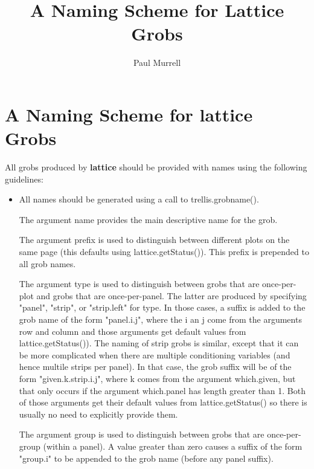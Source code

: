 \documentclass[10pt]{article}
\title{A Naming Scheme for Lattice Grobs}
\author{Paul Murrell}
\date{}
\newcommand{\pkg}[1]{{\bfseries #1}}
\newcommand{\code}[1]{{\ttfamily #1}}
\begin{document}
\maketitle

\raggedright


\section*{A Naming Scheme for \pkg{lattice} Grobs}

\sloppy 

All grobs produced by \pkg{lattice} should be provided with names
using the following guidelines:

\begin{itemize}
\item
All names should be generated using a call to \code{trellis.grobname()}.

The argument \code{name} provides the main descriptive name for the grob.

The argument \code{prefix} is used to distinguish between 
different plots on the same page (this defaults using
\code{lattice.getStatus()}).  This prefix is prepended to all grob names.

The argument \code{type} is used to distinguish between grobs that are
once-per-plot and grobs that are once-per-panel.  The latter are
produced by specifying \code{"panel"}, \code{"strip"}, or
\code{"strip.left"} for \code{type}.  In those cases, a suffix is
added to the grob name of the form \code{"panel.i.j"}, where the
\code{i} an \code{j} come from the arguments \code{row} and
\code{column} and those arguments
 get default values from \code{lattice.getStatus()}).
The naming of strip grobs is similar, except that it can be more
complicated when there are multiple conditioning variables (and hence
multile strips per panel).  In that case, the grob suffix will be of
the form \code{"given.k.strip.i.j"}, where \code{k} comes from
the argument \code{which.given}, but that only occurs if
the argument \code{which.panel} has length greater than 1.
Both of those arguments get their default
values from \code{lattice.getStatus()} so there is usually no need
to explicitly provide them.

The argument \code{group} is used to distinguish between grobs that are
once-per-group (within a panel).  A value greater than zero causes
a suffix of the form \code{"group.i"} to be appended to the grob name
(before any panel suffix).


\end{itemize}
\end{document}
